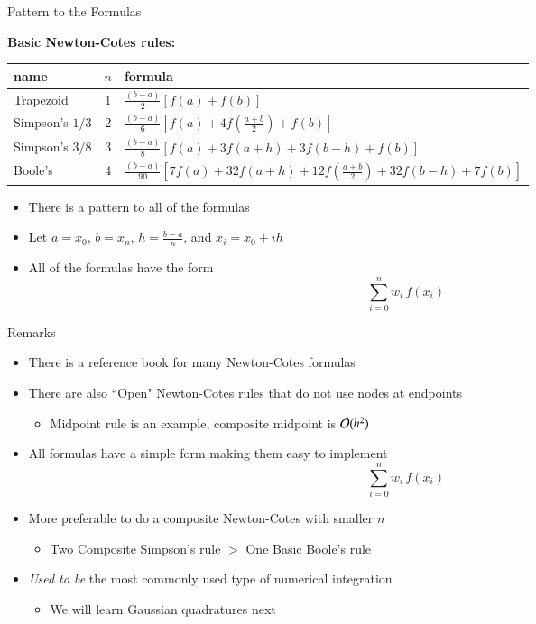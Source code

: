 \documentclass[10pt]{beamer}
\begin{document}
\begin{frame}{Pattern to the Formulas}

   \textbf{Basic Newton-Cotes rules:}
   \begin{tabular}{l c l}
   name & $n$ & formula \\\hline
   Trapezoid       & 1 & $\frac{(b-a)}{2}\left[f(a) + f(b)\right]$\\[5pt]
   Simpson's $1/3$ & 2 & $\frac{(b-a)}{6}\left[f(a) + 4f(\frac{a+b}{2}) + f(b)\right]$\\[5pt]
   Simpson's $3/8$ & 3 & $\frac{(b-a)}{8}\left[f(a) + 3f(a+h) + 3f(b-h) + f(b)\right]$\\[5pt]
   Boole's         & 4 & $\frac{(b-a)}{90}\left[7f(a) + 32f(a+h) + 12f(\frac{a+b}{2}) + 32f(b-h)+7f(b)\right]$\\[5pt]
   \end{tabular}
   \smallskip
   
\begin{itemize}
    \item There is a pattern to all of the formulas 
    \item Let $a=x_0$, $b=x_n$, $h=\frac{b-a}{n}$, and $x_i = x_0 + ih $
    \item All of the formulas have the form 
        $$\sum_{i=0}^n  w_i  \, f(x_i)$$
\end{itemize}
\end{frame}
\begin{frame}{Remarks}
    \begin{itemize}
        \item There is a reference book for many Newton-Cotes formulas\\[4mm] 
        \item There are also ``Open" Newton-Cotes rules that do not use nodes at endpoints
            \begin{itemize}
                \item Midpoint rule is an example, composite midpoint is ${\mathcal{O}}(h^2)$\\[4mm]
            \end{itemize}
        \item All formulas have a simple form making them easy to implement
            $$\sum_{i=0}^n  w_i  \, f(x_i)$$
        \item More preferable to do a composite Newton-Cotes with smaller $n$
            \begin{itemize}
                \item Two Composite Simpson's rule $>$ One Basic Boole's rule \\[4mm] 
            \end{itemize}
        \item \emph{Used to be} the most commonly used type of numerical integration
            \begin{itemize}
                \item We will learn Gaussian quadratures next
            \end{itemize}
    \end{itemize}
\end{frame}
\end{document}
